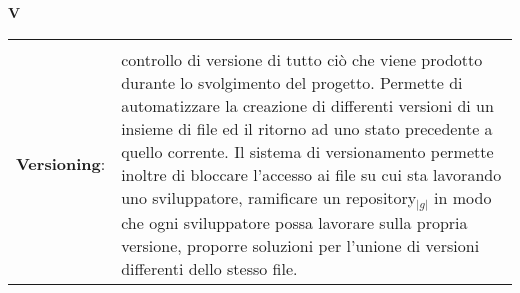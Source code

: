\hfill\Huge{\textbf{V}}\\
\normalsize
\label{tabVers}
	\begin{longtable}{p{} p{}} 
	    \toprule
	    \\
	    \textbf{Versioning}:	&	controllo di versione di tutto ciò che viene prodotto durante lo svolgimento del progetto. Permette di automatizzare la creazione di differenti versioni di un insieme di file ed il ritorno ad uno stato precedente 
						a quello corrente. Il sistema di versionamento permette inoltre di bloccare l’accesso ai file su cui sta lavorando uno sviluppatore, ramificare un repository$_{|g|}$ in modo che ogni sviluppatore possa lavorare 
						sulla propria versione, proporre soluzioni per l’unione di versioni differenti dello stesso file.\\
	\end{longtable}
\newpage


